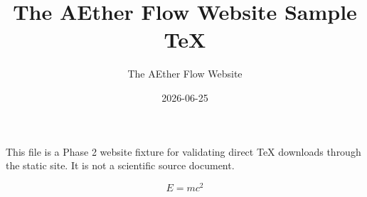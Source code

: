 \documentclass{article}
\title{The AEther Flow Website Sample TeX}
\author{The AEther Flow Website}
\date{2026-06-25}
\begin{document}
\maketitle

This file is a Phase 2 website fixture for validating direct TeX downloads
through the static site. It is not a scientific source document.

\[
E = mc^2
\]
\end{document}
